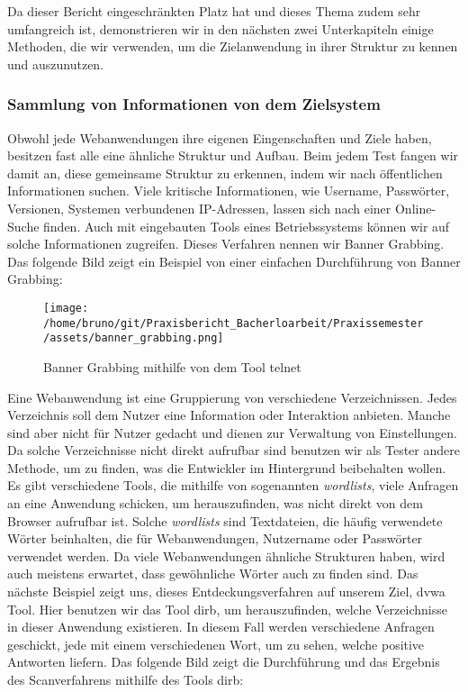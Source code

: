 Da dieser Bericht eingeschränkten Platz hat und dieses Thema zudem sehr umfangreich ist, demonstrieren wir in den nächsten zwei Unterkapiteln einige Methoden, die wir verwenden, um die Zielanwendung in ihrer Struktur zu kennen und auszunutzen.

\subsubsection{Sammlung von Informationen von dem Zielsystem}

Obwohl jede Webanwendungen ihre eigenen Eingenschaften und Ziele haben, besitzen fast alle eine ähnliche Struktur und Aufbau. Beim jedem Test fangen wir damit an, diese gemeinsame Struktur zu erkennen, indem wir nach öffentlichen Informationen suchen. Viele kritische Informationen, wie Username, Passwörter, Versionen, Systemen verbundenen IP-Adressen, lassen sich nach einer Online-Suche finden. Auch mit eingebauten Tools eines Betriebssystems können wir auf solche Informationen zugreifen. Dieses Verfahren nennen wir Banner Grabbing. Das folgende Bild zeigt ein Beispiel von einer einfachen Durchführung von Banner Grabbing:

\begin{figure}[H]
    \centering
    \texttt{[image: /home/bruno/git/Praxisbericht\_Bacherloarbeit/Praxissemester/assets/banner\_grabbing.png]}
    \caption{Banner Grabbing mithilfe von dem Tool telnet}
    \centering
\end{figure}

Eine Webanwendung ist eine Gruppierung von verschiedene Verzeichnissen. Jedes Verzeichnis soll dem Nutzer eine Information oder Interaktion anbieten. Manche sind aber nicht für Nutzer gedacht und dienen zur Verwaltung von Einstellungen. Da solche Verzeichnisse nicht direkt aufrufbar sind  benutzen wir als Tester andere Methode, um zu finden, was die Entwickler im Hintergrund beibehalten wollen. Es gibt verschiedene Tools, die mithilfe von sogenannten \textit{wordlists}, viele Anfragen an eine Anwendung schicken, um herauszufinden, was nicht direkt von dem Browser aufrufbar ist. Solche \textit{wordlists} sind Textdateien, die häufig verwendete Wörter beinhalten, die für Webanwendungen, Nutzername oder Passwörter verwendet werden. Da viele Webanwendungen ähnliche Strukturen haben, wird auch meistens erwartet, dass gewöhnliche Wörter auch zu finden sind. Das nächste Beispiel zeigt uns, dieses Entdeckungsverfahren auf unserem Ziel, \gls{dvwa} Tool. Hier benutzen wir das Tool \gls{dirb}, um herauszufinden, welche Verzeichnisse in dieser Anwendung existieren. In diesem Fall werden verschiedene Anfragen geschickt, jede mit einem verschiedenen Wort, um zu sehen, welche positive Antworten liefern. Das folgende Bild zeigt die Durchführung und das Ergebnis des Scanverfahrens mithilfe des Tools \gls{dirb}:

